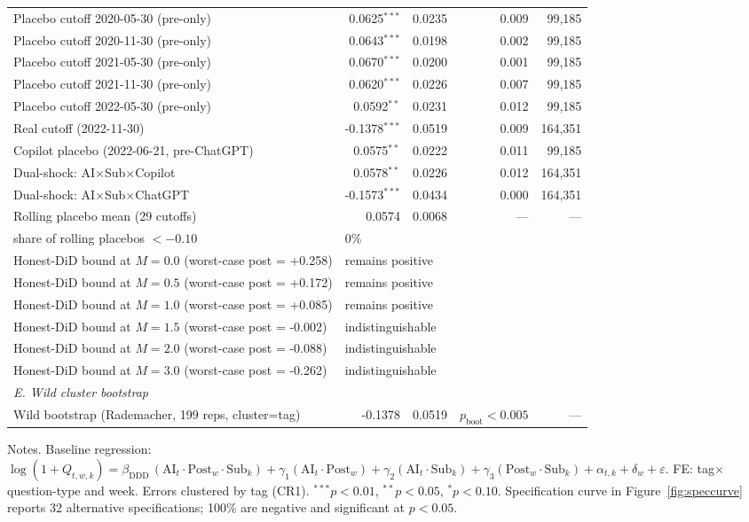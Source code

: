 \begin{table}[!htbp]
\begin{tabular}{lrrrr}
  Placebo cutoff 2020-05-30 (pre-only) & 0.0625$^{***}$ & 0.0235 & 0.009 & 99,185 \\
  Placebo cutoff 2020-11-30 (pre-only) & 0.0643$^{***}$ & 0.0198 & 0.002 & 99,185 \\
  Placebo cutoff 2021-05-30 (pre-only) & 0.0670$^{***}$ & 0.0200 & 0.001 & 99,185 \\
  Placebo cutoff 2021-11-30 (pre-only) & 0.0620$^{***}$ & 0.0226 & 0.007 & 99,185 \\
  Placebo cutoff 2022-05-30 (pre-only) & 0.0592$^{**}$ & 0.0231 & 0.012 & 99,185 \\
  Real cutoff (2022-11-30) & -0.1378$^{***}$ & 0.0519 & 0.009 & 164,351 \\
  Copilot placebo (2022-06-21, pre-ChatGPT) & 0.0575$^{**}$ & 0.0222 & 0.011 & 99,185 \\
  Dual-shock: AI$\times$Sub$\times$Copilot & 0.0578$^{**}$ & 0.0226 & 0.012 & 164,351 \\
  Dual-shock: AI$\times$Sub$\times$ChatGPT & -0.1573$^{***}$ & 0.0434 & 0.000 & 164,351 \\
  Rolling placebo mean (29 cutoffs) & 0.0574 & 0.0068 & --- & --- \\
  \quad share of rolling placebos $< -0.10$ & \multicolumn{4}{l}{0\%} \\
  Honest-DiD bound at $M=0.0$ (worst-case post = +0.258) & \multicolumn{4}{l}{remains positive} \\
  Honest-DiD bound at $M=0.5$ (worst-case post = +0.172) & \multicolumn{4}{l}{remains positive} \\
  Honest-DiD bound at $M=1.0$ (worst-case post = +0.085) & \multicolumn{4}{l}{remains positive} \\
  Honest-DiD bound at $M=1.5$ (worst-case post = -0.002) & \multicolumn{4}{l}{indistinguishable} \\
  Honest-DiD bound at $M=2.0$ (worst-case post = -0.088) & \multicolumn{4}{l}{indistinguishable} \\
  Honest-DiD bound at $M=3.0$ (worst-case post = -0.262) & \multicolumn{4}{l}{indistinguishable} \\
\midrule
\multicolumn{5}{l}{\textit{E. Wild cluster bootstrap}} \\
  Wild bootstrap (Rademacher, 199 reps, cluster=tag) & -0.1378 & 0.0519 & $p_{\text{boot}}<0.005$ & --- \\
\bottomrule
\end{tabular}
\begin{minipage}{0.95\textwidth}
\scriptsize
Notes. Baseline regression: $\log(1+Q_{t,w,k}) = \beta_{\text{DDD}}\,(\text{AI}_t\cdot\text{Post}_w\cdot\text{Sub}_k) + \gamma_1 (\text{AI}_t\cdot\text{Post}_w) + \gamma_2 (\text{AI}_t\cdot\text{Sub}_k) + \gamma_3 (\text{Post}_w\cdot\text{Sub}_k) + \alpha_{t,k} + \delta_w + \varepsilon$. FE: tag$\times$question-type and week. Errors clustered by tag (CR1). $^{***}p<0.01$, $^{**}p<0.05$, $^{*}p<0.10$. Specification curve in Figure~\ref{fig:speccurve} reports 32 alternative specifications; 100\% are negative and significant at $p<0.05$.
\end{minipage}
\end{table}